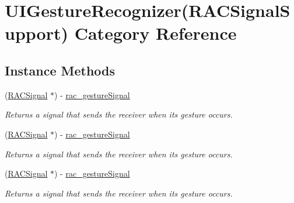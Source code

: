 \hypertarget{category_u_i_gesture_recognizer_07_r_a_c_signal_support_08}{}\section{U\+I\+Gesture\+Recognizer(R\+A\+C\+Signal\+Support) Category Reference}
\label{category_u_i_gesture_recognizer_07_r_a_c_signal_support_08}
\subsection*{Instance Methods}
\begin{DoxyCompactItemize}
\item 
\mbox{\label{category_u_i_gesture_recognizer_07_r_a_c_signal_support_08_a45beec570ea5abe99243f075e05d14be}} 
(\mbox{\hyperlink{interface_r_a_c_signal}{R\+A\+C\+Signal}} $\ast$) -\/ \mbox{\hyperlink{category_u_i_gesture_recognizer_07_r_a_c_signal_support_08_a45beec570ea5abe99243f075e05d14be}{rac\+\_\+gesture\+Signal}}
\begin{DoxyCompactList}\small\item\em Returns a signal that sends the receiver when its gesture occurs. \end{DoxyCompactList}\item 
\mbox{\label{category_u_i_gesture_recognizer_07_r_a_c_signal_support_08_a45beec570ea5abe99243f075e05d14be}} 
(\mbox{\hyperlink{interface_r_a_c_signal}{R\+A\+C\+Signal}} $\ast$) -\/ \mbox{\hyperlink{category_u_i_gesture_recognizer_07_r_a_c_signal_support_08_a45beec570ea5abe99243f075e05d14be}{rac\+\_\+gesture\+Signal}}
\begin{DoxyCompactList}\small\item\em Returns a signal that sends the receiver when its gesture occurs. \end{DoxyCompactList}\item 
\mbox{\label{category_u_i_gesture_recognizer_07_r_a_c_signal_support_08_a45beec570ea5abe99243f075e05d14be}} 
(\mbox{\hyperlink{interface_r_a_c_signal}{R\+A\+C\+Signal}} $\ast$) -\/ \mbox{\hyperlink{category_u_i_gesture_recognizer_07_r_a_c_signal_support_08_a45beec570ea5abe99243f075e05d14be}{rac\+\_\+gesture\+Signal}}
\begin{DoxyCompactList}\small\item\em Returns a signal that sends the receiver when its gesture occurs. \end{DoxyCompactList}\end{DoxyCompactItemize}


